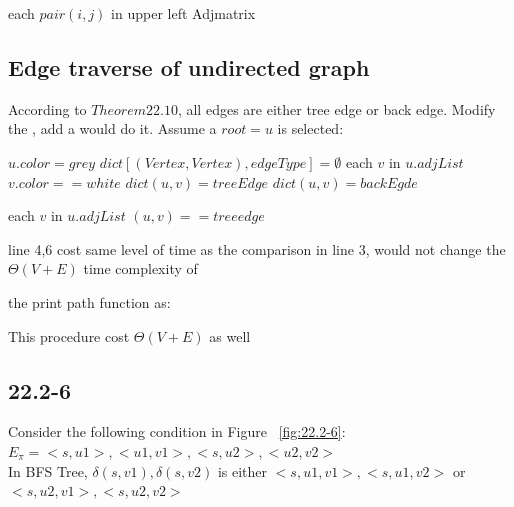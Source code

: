 \documentclass[]{article}
\begin{document}
\begin{codebox}
	\li \For each $pair(i,j)$ in upper left Adjmatrix
	\li		\Do {}
	\End
\end{codebox}

\subsection{Edge traverse of undirected graph}

According to $Theorem 22.10$, all edges are either tree edge or back edge. Modify the , add a  would do it. Assume a $root = u$ is selected:

\begin{codebox}
	
	\li $u.color = grey$
	\li $dict[(Vertex,Vertex), edgeType] = \emptyset$
	\li	\For each $v$ in $u.adjList$
	\li \Do \If $v.color == white$
	\li 	\Then $dict(u,v) = treeEdge$
	\li 		  {}
	\li 	\Else $dict(u,v) = backEgde$
	\End
	\End
	\li {}
	
\end{codebox}

\begin{codebox}
	
	\li {}
	\li	\For each $v$ in $u.adjList$
	\li \Do \If $(u,v) == treeedge$
	\li 	\Then {}
	\li     {}
	\li 	\Else {}
	\End
	\End
	
\end{codebox}

line 4,6 cost same level of time as the comparison in line 3, would not change the $\Theta(V+E)$ time complexity of 

the print path function as:

This procedure cost $\Theta(V+E)$ as well

\subsection{22.2-6}

Consider the following condition in Figure ~\ref{fig:22.2-6}: \\
$E_{\pi} = <s, u1>, <u1, v1>, <s, u2>, <u2, v2>$\\
In BFS Tree, $\delta (s, v1), \delta (s, v2) $ is either $<s, u1, v1>, <s, u1, v2>$ or $<s, u2, v1>, <s, u2, v2>$
\end{document}
